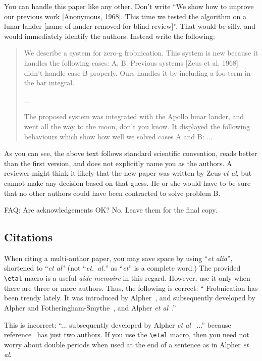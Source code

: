 \documentclass{bmvc2k}
\def\etal{\emph{et al}\bmvaOneDot}
\begin{document}
You can handle this paper like any other.  Don't write ``We show how to
improve our previous work [Anonymous, 1968].  This time we tested the
algorithm on a lunar lander [name of lander removed for blind review]''.
That would be silly, and would immediately identify the authors. Instead
write the following:
\begin{quotation}
\noindent
   We describe a system for zero-g frobnication.  This
   system is new because it handles the following cases:
   A, B.  Previous systems [Zeus et al. 1968] didn't
   handle case B properly.  Ours handles it by including
   a foo term in the bar integral.

   ...

   The proposed system was integrated with the Apollo
   lunar lander, and went all the way to the moon, don't
   you know.  It displayed the following behaviours
   which show how well we solved cases A and B: ...
\end{quotation}
As you can see, the above text follows standard scientific convention,
reads better than the first version, and does not explicitly name you as
the authors.  A reviewer might think it likely that the new paper was
written by Zeus \etal, but cannot make any decision based on that guess.
He or she would have to be sure that no other authors could have been
contracted to solve problem B.

FAQ: Are acknowledgements OK?  No.  Leave them for the final copy.

\subsection{Citations}
When citing a multi-author paper, you may save space by using ``{\em et
alia}'', shortened to ``\etal'' (not ``{\em et.\ al.}'' as ``{\em et}'' is
a complete word.)  The provided \verb'\etal' macro is a useful {\em aide
memoire} in this regard.  However, use it only when there are three or more
authors.  Thus, the following is correct: `` Frobnication has been trendy
lately.  It was introduced by Alpher~\cite{Alpher02}, and subsequently
developed by Alpher and Fotheringham-Smythe~\cite{Alpher03}, and Alpher
\etal~\cite{Alpher04}.''

This is incorrect: ``... subsequently developed by Alpher \etal~\cite{Alpher03} ...''
because reference~\cite{Alpher03} has just two authors.  If you use the
\verb'\etal' macro, then you need not worry about double periods
when used at the end of a sentence as in Alpher \etal.
\end{document}
